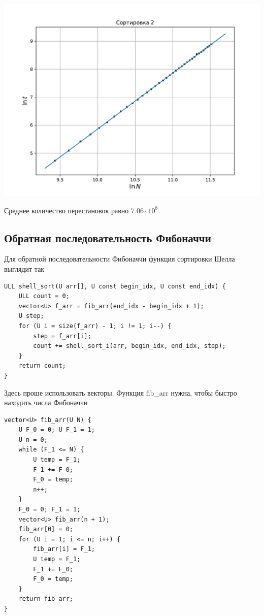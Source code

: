 \documentclass[a4paper,12pt]{article}
\begin{document}
\begin{center}
\includegraphics[scale=0.6]{Figure_3.pdf}
\end{center}

Среднее количество перестановок равно $7.06 \cdot 10^8$.

\subsection*{Обратная последовательность Фибоначчи}
Для обратной последовательности Фибоначчи функция сортировки Шелла выглядит так

\begin{lstlisting}
ULL shell_sort(U arr[], U const begin_idx, U const end_idx) {
    ULL count = 0;
    vector<U> f_arr = fib_arr(end_idx - begin_idx + 1);
    U step;
    for (U i = size(f_arr) - 1; i != 1; i--) {
        step = f_arr[i];
        count += shell_sort_i(arr, begin_idx, end_idx, step);
    }
    return count;
}
\end{lstlisting}

Здесь проше использовать векторы. Функция fib\_arr нужна, чтобы быстро находить числа Фибоначчи

\begin{lstlisting}
vector<U> fib_arr(U N) {
    U F_0 = 0; U F_1 = 1;
    U n = 0;
    while (F_1 <= N) {
        U temp = F_1;
        F_1 += F_0;
        F_0 = temp;
        n++;
    }
    F_0 = 0; F_1 = 1;
    vector<U> fib_arr(n + 1);
    fib_arr[0] = 0;
    for (U i = 1; i <= n; i++) {
        fib_arr[i] = F_1;
        U temp = F_1;
        F_1 += F_0;
        F_0 = temp;
    }
    return fib_arr;
}
\end{lstlisting}
\end{document}
